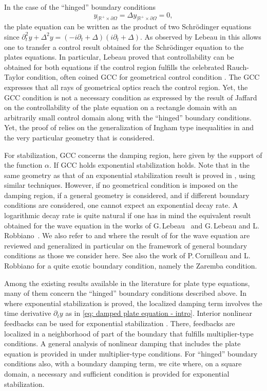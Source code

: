 \documentclass[JEP,XML,SOM,Unicode,published]{cedram}
\theoremstyle{plain}
\theoremstyle{definition}
\def\R{\mathbb{R}}
\begin{document}
In the case of the ``hinged'' boundary conditions
\begin{equation*}
y_{|\R^+\times \partial\Omega}= \Delta
y_{|\R^+\times \partial\Omega}=0,
\end{equation*}
the plate equation can be written as the product of two Schrödinger
equations since
$\partial^2_t y +\Delta^2y = (-i \partial_t + \Delta) (i \partial_t + \Delta)$.
As observed by Lebeau in \cite{Lebeau:92} this allows one to transfer
a control result obtained for the Schrödinger equation to
the plates equations. In particular, Lebeau proved that controllability
can be obtained for both equations if the control region fulfills the celebrated
Rauch-Taylor condition, often coined GCC for geometrical control
condition \cite{RT:74,BLR:92}. The GCC expresses that all rays of
geometrical optics reach the control region.
Yet, the GCC condition is not a necessary condition as expressed by the result of
Jaffard~\cite{Jaffard:90} on the controllability of the plate equation on a
rectangle domain with an arbitrarily small control domain along with
the ``hinged'' boundary conditions. Yet, the proof of \cite{Jaffard:90}
relies on the generalization of Ingham type inequalities in
\cite{Kahane:62} and the very particular geometry that is considered.

For stabilization, GCC concerns the damping region, here given by the
support of the function $\alpha$. If GCC holds
exponential stabilization holds. Note that in the same geometry as that
of \cite{Jaffard:90} an exponential stabilization result is proved
in \cite{RTT:06}, using similar techniques.
However, if no geometrical condition is imposed on the damping region,
if a general geometry is considered, and if different boundary
conditions are considered,
one cannot expect an exponential decay rate. A
logarithmic decay rate is quite natural if one has in mind the
equivalent result obtained for the wave equation in the works of
G.\,Lebeau~\cite{Lebeau:96} and G.\,Lebeau and
L.\,Robbiano~\cite{LR:97}. We also refer to 
\cite[Chap.\,6]{JGL-vol1} and \cite[Chap.\,10 \& 11]{JGL-vol2} where the
result of \cite{Lebeau:96,LR:97} for the wave equation are reviewed and generalized in
particular on the framework of general boundary conditions as those we
consider here. See also the work of P.\,Cornilleau and L.\,Robbiano for
a quite exotic boundary condition, namely the Zaremba condition.

Among the existing results available in the literature for
plate type equations, many of them concern the ``hinged'' boundary
conditions described above. In \cite{RTT:06} where exponential
stabilization is proved, the localized damping term involves the time
derivative $\partial_ty$ as in \eqref{eq: damped plate equation -
intro}. Interior nonlinear feedbacks can be used for exponential
stabilization \cite{Tebou:09}. There, feedbacks are localized in a
neighborhood of part of the boundary that fulfills multiplier-type
conditions. A general analysis of nonlinear damping that includes the
plate equation is provided in \cite{AA:11} under multiplier-type
conditions. For ``hinged'' boundary conditions also, with a boundary
damping term, we cite \cite{ATT:07} where, on a square domain, a
necessary and sufficient condition is provided for exponential
stabilization.
\end{document}

